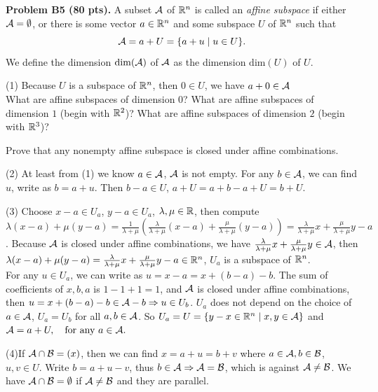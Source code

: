 \documentclass[12pt]{article}
\begin{document}
\vspace {0.5cm}\noindent
{\bf Problem B5 (80 pts).}
A subset ${\cal A}$ of $\mathbb{R}^n$ is called an {\it affine subspace\/} if
either ${\cal A} = \emptyset$, or there is some vector $a\in \mathbb{R}^n$
and some subspace $U$ of $\mathbb{R}^n$ such that
\[
{\cal A} = a + U = \{a + u \mid u \in U\}.
\]
We define the dimension $\mathrm{dim}({\cal A})$ of ${\cal A}$ as the dimension
$\mathrm{dim}(U)$ of $U$.

\medskip
(1)
Because $U$ is a subspace of $\mathbb{R}^n$, then $0 \in U$, we have $
a + 0 \in {\cal A}$
\medskip \\
What are affine subspaces of dimension $0$?
What are affine subspaces of dimension $1$ (begin with $\mathbb{R}^2$)?
What are affine subspaces of dimension $2$ (begin with $\mathbb{R}^3$)?

\medskip
Prove that any nonempty affine subspace is closed under affine
combinations.

\medskip
(2) At least from (1) we know $a \in {\cal A}$, ${\cal A}$ is not empty.
For any $b \in {\cal A}$, we can find $u$, write as $b = a + u$. Then   $b - a \in U$, $a + U = a + b - a + U = b + U$.

\medskip
(3)
Choose $x - a \in U_a$, $y - a \in U_a$, $\lambda, \mu \in \mathbb{R}$, then compute $\lambda (x - a) + \mu (y - a) = \frac{1}{\lambda + \mu}(\frac{\lambda}{\lambda + \mu}(x - a) + \frac{\mu}{\lambda + \mu}(y - a)) = \frac{\lambda}{\lambda + \mu} x + \frac{\mu}{\lambda + \mu} y - a$. Because ${\cal A}$ is closed under affine combinations, we have $\frac{\lambda}{\lambda + \mu} x + \frac{\mu}{\lambda + \mu} y \in {\cal A}$, then $\lambda (x - a) + \mu (y - a) = \frac{\lambda}{\lambda + \mu} x + \frac{\mu}{\lambda + \mu} y - a \in \mathbb{R}^n$, $U_a$ is a subspace of $\mathbb{R}^n$.\\
For any $u \in U_a$, we can write as $u = x - a = x + (b - a) - b$. The sum of coefficients of $x, b, a$ is $1 -1 + 1 = 1$, and ${\cal A}$ is closed under affine combinations, then $u = x + (b -a)-b \in {\cal A} - b \Rightarrow u \in U_b$. $U_a$ does not depend on the choice of $a \in {\cal A}$, $U_a = U_b$ for all $a, b\in {\cal A}$.
So $U_a = U = \{y - x \in \mathbb{R}^n \mid x, y \in {\cal A}\}$ and
$
{\cal A} = a + U, \quad\hbox{for any $a\in {\cal A}$}.
$

\medskip
(4)If ${\cal A}\cap {\cal B} = (x)$, then we can find $x = a + u = b + v$ where $a \in {\cal A}, b \in {\cal B}$, $u, v \in U$. Write $b = a + u - v$, thus $b \in {\cal A} \Rightarrow {\cal A} = {\cal B}$, which is against ${\cal A} \neq {\cal B}$. We have ${\cal A} \cap {\cal B} = \emptyset$ if ${\cal A} \neq {\cal B}$ and they are parallel. 
\end{document}
